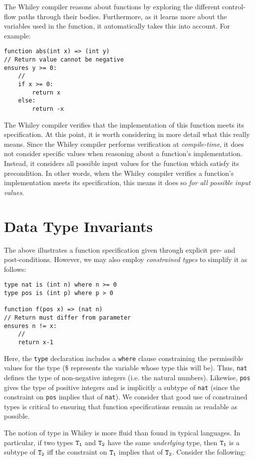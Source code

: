 The Whiley compiler reasons about functions by exploring the different
control-flow paths through their bodies.  Furthermore, as it learns
more about the variables used in the function, it automatically takes
this into account.  For example:
\begin{lstlisting}
function abs(int x) => (int y)
// Return value cannot be negative
ensures y >= 0:
    //
    if x >= 0:
        return x
    else:
        return -x
\end{lstlisting}
The Whiley compiler verifies that the implementation of this function
meets its specification.  At this point, it is worth considering in
more detail what this really means.  Since the Whiley compiler
performs verification at {\em compile-time}, it does not consider
specific values when reasoning about a function's implementation.
Instead, it considers all possible input values for the function which
satisfy its precondition.  In other words, when the Whiley compiler
verifies a function's implementation meets its specification, this
means it does so {\em for all possible input values}.  

\section{Data Type Invariants}

The above illustrates a function specification given through explicit pre- and
post-conditions.  However, we may also employ {\em constrained types}
to simplify it as follows:

\begin{lstlisting}
type nat is (int n) where n >= 0
type pos is (int p) where p > 0

function f(pos x) => (nat n)
// Return must differ from parameter
ensures n != x:
    //
    return x-1
\end{lstlisting}

Here, the \lstinline{type} declaration includes a \lstinline{where}
clause constraining the permissible values for the type ($\$$
represents the variable whose type this will be).  Thus,
\lstinline{nat} defines the type of non-negative integers (i.e. the
natural numbers).  Likewise, \lstinline{pos} gives the type of
positive integers and is implicitly a subtype of \lstinline{nat}
(since the constraint on \lstinline{pos} implies that of
\lstinline{nat}).  We consider that good use of constrained types is
critical to ensuring that function specifications remain as readable
as possible.

The notion of type in Whiley is more fluid than found in typical
languages.  In particular, if two types ${\tt T_1}$ and ${\tt T_2}$
have the same {\em underlying} type, then ${\tt T_1}$ is a subtype of
${\tt T_2}$ iff the constraint on ${\tt T_1}$ implies that of ${\tt
  T_2}$.  Consider the following:


